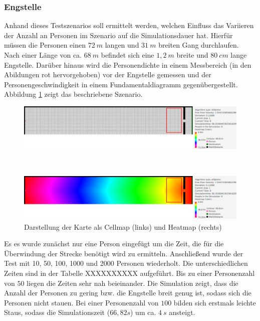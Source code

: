 \subsubsection{Engstelle}
Anhand dieses Testszenarios soll ermittelt werden, welchen Einfluss das Variieren der Anzahl an Personen im Szenario auf die Simulationsdauer hat. Hierfür müssen die Personen einen $72\ m$ langen und $31\ m$ breiten Gang durchlaufen. Nach einer Länge von ca. $68\ m$ befindet sich eine $1,2\ m$ breite und $80\ cm$ lange Engstelle.
Darüber hinaus wird die Personendichte in einem Messbereich (in den Abildungen rot hervorgehoben) vor der Engstelle gemessen und der Personengeschwindigkeit in einem Fundamentaldiagramm gegenübergestellt. Abbildung \ref{fig:engstelleMAP} zeigt das beschriebene Szenario.

\begin{figure}
\centering
\begin{minipage}{1\textwidth}
\centering
  \includegraphics[width=1\linewidth]{abbildungen/engstelle/engstelleMAP.png}
\end{minipage}%
\\
\begin{minipage}{1\textwidth}
\centering
  \includegraphics[width=1\linewidth]{abbildungen/engstelle/engstelleHEATMAP.png}
\end{minipage}
\caption{Darstellung der Karte als Cellmap (links) und Heatmap (rechts)}
\label{fig:engstelleMAP}
\end{figure}

Es es wurde zunächst nur eine Person eingefügt um die Zeit, die für die Überwindung der Strecke benötigt wird zu ermitteln. Anschließend wurde der Test mit 10, 50, 100, 1000 und 2000 Personen wiederholt. Die unterschiedlichen Zeiten sind in der Tabelle XXXXXXXXXX aufgeführt. Bis zu einer Personenzahl von $50$ liegen die Zeiten sehr nah beieinander. Die Simulation zeigt, dass die Anzahl der Personen zu gering bzw. die Engstelle breit genug ist, sodass sich die Personen nicht stauen. Bei einer Personenzahl von $100$ bilden sich erstmals leichte Staus, sodass die Simulationszeit ($66,82 s$) um ca. $4\ s$ ansteigt.\\

